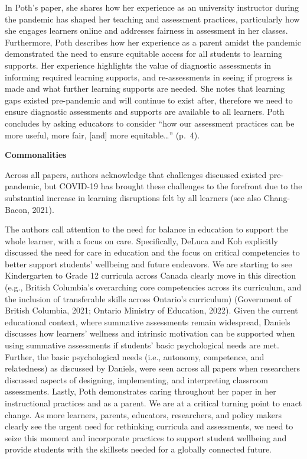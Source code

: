 \documentclass[
]{book}
\begin{document}
In Poth's paper, she shares how her experience as an university instructor during the pandemic has shaped her teaching and assessment practices, particularly how she engages learners online and addresses fairness in assessment in her classes. Furthermore, Poth describes how her experience as a parent amidst the pandemic demonstrated the need to ensure equitable access for all students to learning supports. Her experience highlights the value of diagnostic assessments in informing required learning supports, and re-assessments in seeing if progress is made and what further learning supports are needed. She notes that learning gaps existed pre-pandemic and will continue to exist after, therefore we need to ensure diagnostic assessments and supports are available to all learners. Poth concludes by asking educators to consider ``how our assessment practices can be more useful, more fair, {[}and{]} more equitable\ldots{}'' (p.~4).

\textbf{Commonalities}

Across all papers, authors acknowledge that challenges discussed existed pre-pandemic, but COVID-19 has brought these challenges to the forefront due to the substantial increase in learning disruptions felt by all learners (see also Chang-Bacon, 2021).

The authors call attention to the need for balance in education to support the whole learner, with a focus on care. Specifically, DeLuca and Koh explicitly discussed the need for care in education and the focus on critical competencies to better support students' wellbeing and future endeavors. We are starting to see Kindergarten to Grade 12 curricula across Canada clearly move in this direction (e.g., British Columbia's overarching core competencies across its curriculum, and the inclusion of transferable skills across Ontario's curriculum) (Government of British Columbia, 2021; Ontario Ministry of Education, 2022). Given the current educational context, where summative assessments remain widespread, Daniels discusses how learners' wellness and intrinsic motivation can be supported when using summative assessments if students' basic psychological needs are met. Further, the basic psychological needs (i.e., autonomy, competence, and relatedness) as discussed by Daniels, were seen across all papers when researchers discussed aspects of designing, implementing, and interpreting classroom assessments. Lastly, Poth demonstrates caring throughout her paper in her instructional practices and as a parent.
We are at a critical turning point to enact change. As more learners, parents, educators, researchers, and policy makers clearly see the urgent need for rethinking curricula and assessments, we need to seize this moment and incorporate practices to support student wellbeing and provide students with the skillsets needed for a globally connected future.
\end{document}

